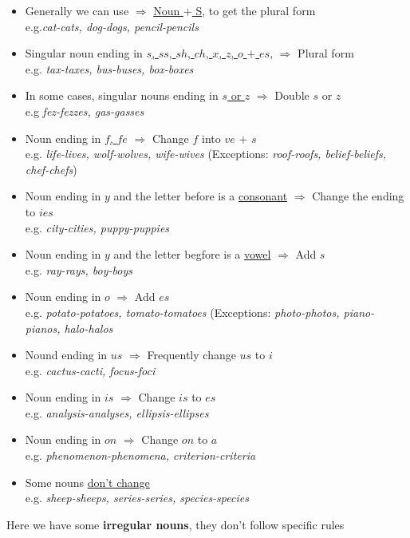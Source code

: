 \documentclass[10pt,a4paper]{article}
\begin{document}
\begin{itemize}
		\item Generally we can use $\Rightarrow$ \underline{Noun $+$ S}, to get the plural form \\e.g.\textit{cat-cats, dog-dogs, pencil-pencils}
		\item Singular noun ending in \underline{$s$, $ss$, $sh$, $ch$, $x$, $z$, $o$ $+$ $es$}, $\Rightarrow$ Plural form \\ e.g. \textit{ tax-taxes, bus-buses, box-boxes}
		\item In some cases, singular nouns ending in \underline{$s$ or $z$} $\Rightarrow$ Double $s$ or $z$ \\
			e.g \textit{fez-fezzes, gas-gasses}
		\item Noun ending in \underline{$f$, $fe$} $\Rightarrow$ Change $f$ into $ve$ $+$ $s$ \\e.g. \textit{life-lives, wolf-wolves, wife-wives} \quad (Exceptions: \textit{roof-roofs, belief-beliefs, chef-chefs})
		\item Noun ending in $y$ and the letter before is a \underline{consonant} $\Rightarrow$ Change the ending to $ies$ \\
			e.g. \textit{city-cities, puppy-puppies}
		\item Noun ending in $y$ and the letter begfore is a \underline{vowel} $\Rightarrow$ Add $s$ \\
			e.g. \textit{ray-rays, boy-boys}
		\item Noun ending in $o$ $\Rightarrow$ Add $es$ \\
			e.g. \textit{potato-potatoes, tomato-tomatoes} \quad (Exceptions: \textit{photo-photos, piano-pianos, halo-halos}
		\item Nound ending in $us$ $\Rightarrow$ Frequently change $us$ to $i$ \\
			e.g. \textit{cactus-cacti, focus-foci}
		\item Noun ending in $is$ $\Rightarrow$ Change $is$ to $es$ \\
			e.g. \textit{analysis-analyses, ellipsis-ellipses}
		\item Noun ending in $on$ $\Rightarrow$ Change $on$ to $a$ \\
			e.g. \textit{phenomenon-phenomena, criterion-criteria}
		\item Some nouns \underline{don't change} \\
			e.g. \textit{sheep-sheeps, series-series, species-species}
\end{itemize}
Here we have some \textbf{irregular nouns}, they don't follow specific rules\\
\end{document}
